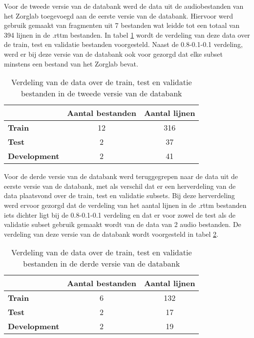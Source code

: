 Voor de tweede versie van de databank werd de data uit de audiobestanden van het Zorglab toegevoegd aan de eerste versie van de databank. Hiervoor werd gebruik gemaakt van fragmenten uit 7 bestanden wat leidde tot een totaal van 394 lijnen in de .rttm bestanden. In tabel \ref{tbl:verdeling-v2} wordt de verdeling van deze data over de train, test en validatie bestanden voorgesteld. Naast de 0.8-0.1-0.1 verdeling, werd er bij deze versie van de databank ook voor gezorgd dat elke subset minstens een bestand van het Zorglab bevat.

\begin{table}[]
    \begin{tabular}{@{}lcc@{}}
        \toprule
        & \multicolumn{1}{l}{\textbf{Aantal bestanden}} & \multicolumn{1}{l}{\textbf{Aantal lijnen}} \\ \midrule
        \textbf{Train}       & 12                      & 316                                        \\
        \textbf{Test}    & 2                                             & 37                     \\
        \textbf{Development} & 2                                             & 41                     \\ \bottomrule
    \end{tabular}
    \caption[Verdeling data tweede versie databank]{\label{tbl:verdeling-v2}Verdeling van de data over de train, test en validatie bestanden in de tweede versie van de databank}
\end{table}

Voor de derde versie van de databank werd teruggegrepen naar de data uit de eerste versie van de databank, met als verschil dat er een herverdeling van de data plaatsvond over de train, test en validatie subsets. Bij deze herverdeling werd ervoor gezorgd dat de verdeling van het aantal lijnen in de .rttm bestanden iets dichter ligt bij de 0.8-0.1-0.1 verdeling en dat er voor zowel de test als de validatie subset gebruik gemaakt wordt van de data van 2 audio bestanden. De verdeling van deze versie van de databank wordt voorgesteld in tabel \ref{tbl:verdeling-v3}.

\begin{table}[]
    \begin{tabular}{@{}lcc@{}}
        \toprule
        & \multicolumn{1}{l}{\textbf{Aantal bestanden}} & \multicolumn{1}{l}{\textbf{Aantal lijnen}} \\ \midrule
        \textbf{Train}       & 6                                             & 132                                        \\
        \textbf{Test}    & 2                                             & 17                     \\
        \textbf{Development} & 2                                             & 19                     \\ \bottomrule
    \end{tabular}
    \caption[Verdeling data tweede versie databank]{\label{tbl:verdeling-v3}Verdeling van de data over de train, test en validatie bestanden in de derde versie van de databank}
\end{table}

